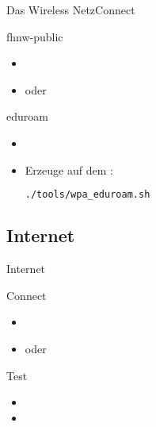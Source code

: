 \begin{frame}[fragile]{Das Wireless Netz}{Connect}
\begin{block}{fhnw-public}
\begin{itemize}
 \item {}
 \item oder 
\end{itemize}
\end{block}
\begin{block}{eduroam}
 \begin{itemize}
  \item {}
  \item Erzeuge  auf dem \host:
  \begin{lstlisting}[language=bash]
./tools/wpa_eduroam.sh
  \end{lstlisting}
  \end{itemize}
\end{block}
\end{frame}

\subsection{Internet}
\begin{frame}{Internet}
\begin{block}{Connect}
 \begin{itemize}
  \item {}
  \item oder 
 \end{itemize}
\end{block}
\begin{block}{Test}
 \begin{itemize}
  \item {}
  \item {}
 \end{itemize}
\end{block}
\end{frame}

